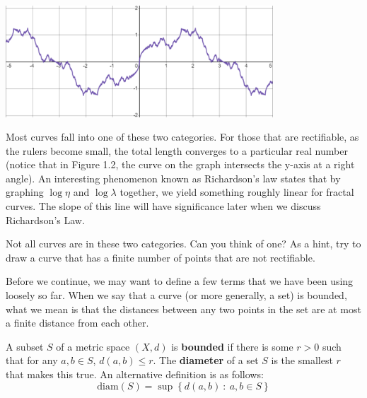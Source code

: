   \begin{center}
    \includegraphics[width=0.75\textwidth]{Images/Chap1/1.1.2.png}
  
  \end{center}

Most curves fall into one of these two categories. For those that are rectifiable, as the rulers become small, the total length converges to a particular real number (notice that in Figure 1.2, the curve on the graph intersects the y-axis at a right angle). An interesting phenomenon known as Richardson's law states that by graphing $\log\eta$ and $\log\lambda$ together, we yield something roughly linear for fractal curves. The slope of this line will have significance later when we discuss Richardson's Law.\par

\begin{exercise}
    Not all curves are in these two categories. Can you think of one? As a hint, try to draw a curve that has a finite number of points that are not rectifiable. 
\end{exercise}

Before we continue, we may want to define a few terms that we have been using loosely so far. When we say that a curve (or more generally, a set) is bounded, what we mean is that the distances between any two points in the set are at most a finite distance from each other.\par 

\begin{definition}
A subset $S$ of a metric space $(X,d)$ is \textbf{bounded} if there is some $r>0$ such that for any $a,b\in S$, $d(a,b)\leq r$. The \textbf{diameter} of a set $S$ is the smallest $r$ that makes this true. An alternative definition is as follows:
\[\text{diam}(S) = \sup\left\{ 
d(a,b) \ : \ a,b\in S \right\}\]
\end{definition}

